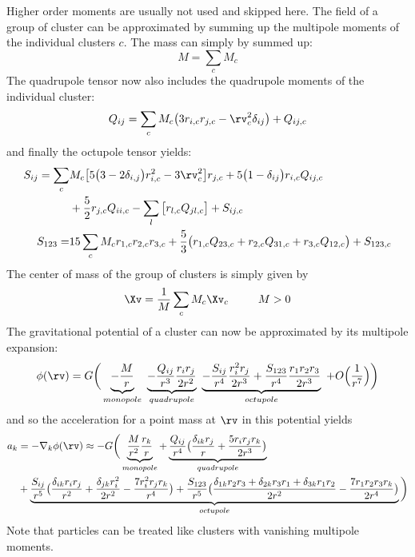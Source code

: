 Higher order moments are usually not used and skipped here. The field of a group of cluster can be approximated by summing up the multipole moments of the individual clusters $c$. The mass can simply by summed up:
\begin{equation}
\label{ch02_grav02_eq006}
M = \sum_{c} M_{c}
\end{equation}
The quadrupole tensor now also includes the quadrupole moments of the individual cluster:
\begin{equation}
\label{ch02_grav02_eq007}
Q_{ij} = \sum_{c} M_{c} \big( 3 r_{i, c} r_{j, c} - \rv_{c}^{2} \delta_{i j} \big) + Q_{i j, c} 
\end{equation}
and finally the octupole tensor yields:
\begin{align}
\label{ch02_grav02_eq008}
S_{ij} = \sum_{c}&  M_{c} \big[ 5 \big( 3 - 2 \delta_{i,j} \big) r_{i, c}^{2} - 3 \rv_{c}^2 \big] r_{j, c} 
+ 5 \big( 1 - \delta_{i j} \big) r_{i, c} Q_{i j, c} \nonumber \\
&+ \frac{5}{2} r_{j, c} Q_{i i, c} - \sum_{l} \big[ r_{l, c} Q_{j l, c} \big] + S_{i j, c} \\
S_{1 2 3} =& 15 \sum_{c} M_{c} r_{1, c} r_{2, c} r_{3, c} + \frac{5}{3} \big( r_{1, c} Q_{2 3, c} + r_{2, c} Q_{3 1, c} + r_{3, c} Q_{1 2, c} \big) + S_{1 2 3, c }
\end{align}
The center of mass of the group of clusters is simply given by 
\begin{equation}
\label{ch02_grav02_eq009}
\Xv = \frac{1}{M} \sum_{c} M_{c} \Xv_{c} ~~~~~~~~  M > 0
\end{equation}
The gravitational potential of a cluster can now be approximated by its multipole expansion:
\begin{equation}
\label{ch02_grav02_eq010}
\phi(\rv) = G \bigg(
\underbrace{ - \frac{M}{r} }_{monopole} ~ 
\underbrace{ - \frac{Q_{i j}}{r^{3}} \frac{r_{i} r_{j} }{2 r^{2} } }_{quadrupole}~ 
\underbrace{ - \frac{S_{i j}}{r^{4}} \frac{r_{i}^2 r_{j}}{2 r^{3} } + \frac{ S_{1 2 3} }{r^{4}}\frac{ r_{1} r_{2} r_{3} }{2 r^{3}} }_{octupole}~ 
+ O\Big(\frac{1}{r^{7}}\Big) \bigg)
\end{equation}
and so the acceleration for a point mass at $\rv$ in this potential yields
\begin{align}
\label{ch02_grav02_eq011}
a_{k} &= - \nabla_{k} \phi(\rv) \approx - G \bigg(
\underbrace{ \frac{M}{r^{2}} \frac{r_{k}}{r} }_{monopole}+ 
\underbrace{ \frac{Q_{i j}}{r^{4}}
\big( \frac{\delta_{i k} r_{j} }{r} + \frac{5 r_{i} r_{j} r_{k} }{2r^{3}} \big)
}_{quadrupole} \nonumber \\
&+ \underbrace{ \frac{S_{i j}}{r^{5}}
\big( \frac{ \delta_{i k} r_{i} r_{j} }{r^{2}}
+ \frac{ \delta_{j k} r_{i}^{2} }{2 r^{2} }
- \frac{7 r_{i}^{2} r_{j} r_{k} }{r^{4} } \big) 
 + \frac{S_{1 2 3}}{r^{5} }
\big( \frac{\delta_{1 k} r_{2} r_{3} + \delta_{2 k} r_{3} r_{1} + \delta_{3 k} r_{1} r_{2}}{2 r^{2}} 
- \frac{7 r_{1} r_{2} r_{3} r_{k} }{2 r^{4}}\big) 
}_{octupole}
\bigg)
\end{align}
Note that particles can be treated like clusters with vanishing multipole moments.

